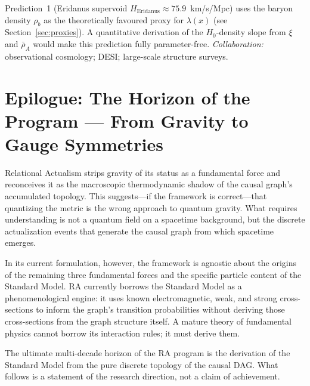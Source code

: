\documentclass[11pt,a4paper]{article}
\theoremstyle{plain}
\theoremstyle{definition}
\theoremstyle{remark}
\begin{document}
\begin{description}[leftmargin=2em,labelwidth=!,labelsep=0.5em]
\item[\textbf{O6: Quantitative $H_0$-density slope.}]
Prediction~1 (Eridanus supervoid $H_{\mathrm{Eridanus}} \approx 75.9$~km/s/Mpc)
uses the baryon density $\rho_b$ as the theoretically favoured proxy for
$\lambda(x)$ (see Section~\ref{sec:proxies}). A quantitative derivation
of the $H_0$-density slope from $\xi$ and $\bar\rho_A$ would make this
prediction fully parameter-free.
\textit{Collaboration:} observational cosmology; DESI; large-scale structure surveys.

\end{description}

\section*{Epilogue: The Horizon of the Program --- From Gravity to Gauge Symmetries}
\label{sec:epilogue}

Relational Actualism strips gravity of its status as a fundamental force and
reconceives it as the macroscopic thermodynamic shadow of the causal graph's
accumulated topology. This suggests---if the framework is correct---that
quantizing the metric is the wrong approach to quantum gravity. What requires
understanding is not a quantum field on a spacetime background, but the discrete
actualization events that generate the causal graph from which spacetime emerges.

In its current formulation, however, the framework is agnostic about the origins
of the remaining three fundamental forces and the specific particle content of the
Standard Model. RA currently borrows the Standard Model as a phenomenological
engine: it uses known electromagnetic, weak, and strong cross-sections to inform
the graph's transition probabilities without deriving those cross-sections from
the graph structure itself. A mature theory of fundamental physics cannot borrow
its interaction rules; it must derive them.

The ultimate multi-decade horizon of the RA program is the derivation of the
Standard Model from the pure discrete topology of the causal DAG. What follows
is a statement of the research direction, not a claim of achievement.
\end{document}
